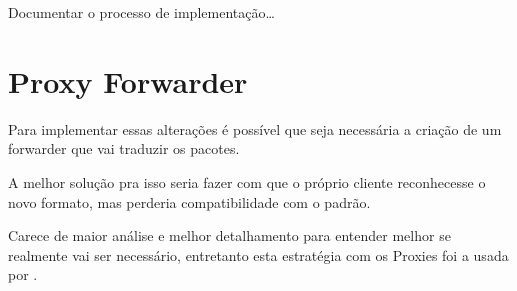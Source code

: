 \documentclass[twoside,english,brazilian]{UNISINOSmonografia}
\begin{document}
	Documentar o processo de implementação\ldots
	
	\section{Proxy Forwarder}
		
		Para implementar essas alterações é possível que seja necessária
		a criação de um forwarder que vai traduzir os pacotes.
		
		A melhor solução pra isso seria fazer com que o próprio cliente
		reconhecesse o novo formato, mas perderia compatibilidade com
		o padrão.
		
		Carece de maior análise e melhor detalhamento para entender 
		melhor se realmente vai ser necessário, entretanto esta estratégia
		com os Proxies foi a usada por \cite{Choi2009}.
	
	
	
	



%


%
\end{document}
